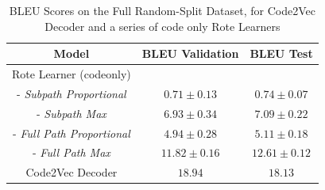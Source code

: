 \begin{table}[ht!]
\begin{center}
\begin{tabular}{ c | c | c  }
    Model                             & BLEU Validation  & BLEU Test      \\
    \hline
    Rote Learner (codeonly)                  &  &  \\
    - \textit{Subpath Proportional}              & $ 0.71 \pm  0.13 $ & $ 0.74 \pm 0.07 $   \\
    - \textit{Subpath Max}                       & $ 6.93 \pm  0.34 $ & $ 7.09 \pm 0.22 $  \\
    - \textit{Full Path Proportional}            & $ 4.94 \pm  0.28 $ & $ 5.11 \pm 0.18 $  \\
    - \textit{Full Path Max}                     & $ 11.82 \pm  0.16 $ & $ 12.61 \pm 0.12 $  \\
    \hline
    Code2Vec Decoder                             & $ 18.94 $ & $ 18.13 $  \\
    \hline 
\end{tabular}
\caption {BLEU Scores on the Full Random-Split Dataset, for Code2Vec Decoder and a series of code only Rote Learners}
\label{table:name_code2vec_solo}
\end{center}
\end{table}

